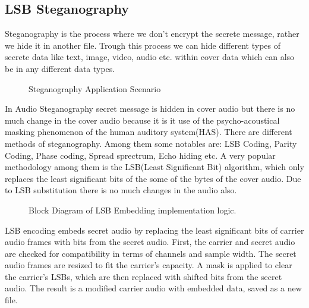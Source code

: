 \documentclass{article}
\begin{document}
\subsection{LSB Steganography}
\label{sec:steganography}
Steganography is the process where we don't encrypt the secrete message, rather we hide it in another file. Trough this process we can hide different types of secrete data like text, image, video, audio etc. within cover data which can also be in any different data types.\cite{jayaram2011information}\cite{hemeida2021comparative}
\begin{figure}[H]
    \begin{center}
        
        \caption{Steganography Application Scenario}
        \label{fig:stegoApplication}
    \end{center}
\end{figure}

In Audio Steganography secret message is hidden in cover audio but there is no much change in the cover audio because it is it use of the psycho-acoustical masking phenomenon of the human auditory system(HAS). There are different methods of steganography. Among them some notables are: LSB Coding, Parity Coding, Phase coding, Spread sprectrum, Echo hiding etc.\cite{hemeida2021comparative} A very popular methodology among them is the LSB(Least Significant Bit) algorithm, which only replaces the least significant bits of the some of the bytes of the cover audio. Due to LSB substitution there is no much changes in the audio also.

\begin{figure}[!h]
    \begin{center}
        
        \caption{Block Diagram of LSB Embedding implementation logic.}
        \label{fig:stegoEmbed}
    \end{center}
\end{figure}

LSB encoding embeds secret audio by replacing the least significant bits of carrier audio frames with bits from the secret audio. First, the carrier and secret audio are checked for compatibility in terms of channels and sample width. The secret audio frames are resized to fit the carrier's capacity. A mask is applied to clear the carrier's LSBs, which are then replaced with shifted bits from the secret audio. The result is a modified carrier audio with embedded data, saved as a new file.
\end{document}
